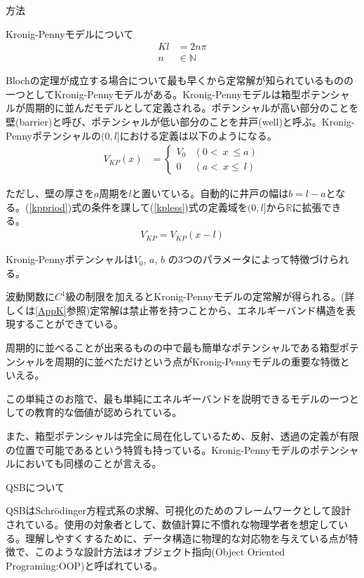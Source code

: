 \documentclass[a4paper, lualatex]{bxjsarticle}
\newcommand{\eref}[1]{(\ref{#1})式}
\begin{document}
\begin{section}{方法}
\begin{subsection}{Kronig-Pennyモデルについて}
\begin{align}
         Kl&=2n\pi\nonumber\\
            n&\in \mathbb{N}
        \end{align}
        \par Blochの定理が成立する場合について最も早くから定常解が知られているものの一つとしてKronig-Pennyモデルがある。Kronig-Pennyモデルは箱型ポテンシャルが周期的に並んだモデルとして定義される。ポテンシャルが高い部分のことを壁(barrier)と呼び、ポテンシャルが低い部分のことを井戸(well)と呼ぶ\cite{Anker}。Kronig-Pennyポテンシャルの$(0,l]$における定義は以下のようになる。
        \begin{align}
         V_{KP}(x)&=\begin{cases}V_0&(0 <\ x\ \le a)\\ 0&(a <\ x\le\ l) \end{cases}\label{kpless}
        \end{align}
        \par ただし、壁の厚さを$a$周期を$l$と置いている。自動的に井戸の幅は$b=l-a$となる。\eref{kppriod}の条件を課して\eref{kpless}の定義域を$(0, l]$から$\mathbb{R}$に拡張できる。
        \begin{align}
        V_{KP}=V_{KP}(x-l)
        \label{kppriod}
        \end{align}
        \par Kronig-Pennyポテンシャルは$V_0$, $a$, $b$ の3つのパラメータによって特徴づけられる。
        \par 波動関数に$C^1$級の制限を加えるとKronig-Pennyモデルの定常解が得られる。(詳しくは\ref{AppK}参照)定常解は禁止帯を持つことから、エネルギーバンド構造を表現することができている。
        \par 周期的に並べることが出来るものの中で最も簡単なポテンシャルである箱型ポテンシャルを周期的に並べただけという点がKronig-Pennyモデルの重要な特徴といえる。
        \par この単純さのお陰で、最も単純にエネルギーバンドを説明できるモデルの一つとしての教育的な価値が認められている\cite{Pavelich}。
        \par また、箱型ポテンシャルは完全に局在化しているため、反射、透過の定義が有限の位置で可能であるという特質も持っている。Kronig-Pennyモデルのポテンシャルにおいても同様のことが言える。
    \end{subsection}
    \begin{subsection}{QSBについて}
    \par QSBはSchrödinger方程式系の求解、可視化のためのフレームワークとして設計されている。使用の対象者として、数値計算に不慣れな物理学者を想定している。理解しやすくするために、データ構造に物理的な対応物を与えている点が特徴で、このような設計方法はオブジェクト指向(Object Oriented Programing:OOP)と呼ばれている。

\end{subsection}
\end{section}
\end{document}
